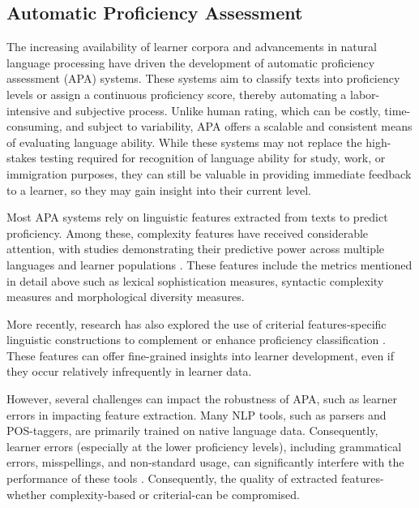 \subsection{Automatic Proficiency Assessment}


The increasing availability of learner corpora and advancements in natural language processing have driven the
development of automatic proficiency assessment (APA) systems. These systems aim to classify texts into proficiency
levels or assign a continuous proficiency score, thereby automating a labor-intensive and subjective process. Unlike
human rating, which can be costly, time-consuming, and subject to variability, APA offers a scalable and consistent
means of evaluating language ability. While these systems may not replace the
high-stakes testing required for recognition of language ability for study, work, or immigration purposes, they can
still be valuable in providing immediate feedback to a learner, so they may gain insight into their current level.

Most APA systems rely on linguistic features extracted from texts to predict proficiency. Among these, complexity
features have received considerable attention, with studies demonstrating their predictive power across multiple
languages and learner populations \citep{Lu2010,Ortega2003,Brezina2019,Jiang2019}. These features include the metrics
mentioned in detail above such as lexical sophistication measures, syntactic complexity measures and morphological
diversity measures.

More recently, research has also explored the use of criterial features-specific linguistic constructions to
complement or enhance proficiency classification
\citep{Hawkins_Buttery_2010,tono2013,tono2018,defino2022, Kim2021}. These features can offer fine-grained insights into
learner development, even if they occur relatively infrequently in learner data.


However, several challenges can impact the robustness of APA, such as learner errors in impacting feature extraction.
Many
NLP tools, such as parsers and POS-taggers, are primarily trained on native language data. Consequently, learner
errors (especially at the
lower proficiency levels), including grammatical
errors, misspellings, and non-standard usage, can
significantly interfere with the performance of these tools
\citep{Meurers_2015,Meurers2017}.
Consequently, the quality of extracted
features-whether complexity-based or criterial-can be compromised.

